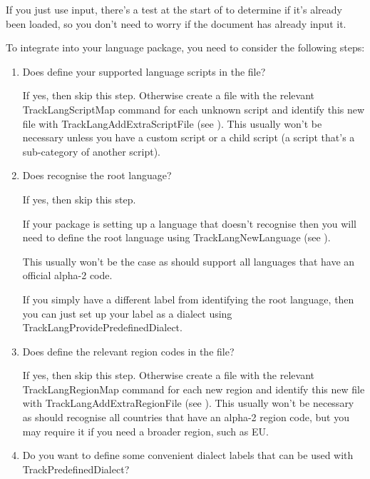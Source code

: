 \documentclass[titlepage=false,oneside,
 fontsize=12pt,captions=tableheading]{scrbook}
\begin{document}
If you just use \gls{input}, there's a test at the start of
 to determine if it's already been loaded, so
you don't need to worry if the document has already input it.

To integrate  into your language package, you need 
to consider the following steps:
\begin{enumerate}
\item Does  define your supported  language
scripts in the  file?

If yes, then skip this step. Otherwise create a file with the
relevant \gls{TrackLangScriptMap} command for each unknown script and identify
this new file with \gls{TrackLangAddExtraScriptFile} (see
). This usually
won't be necessary unless you have a custom script or a child script
(a script that's a sub-category of another script).

\item Does  recognise the root language?

If yes, then skip this step.

If your package is setting up a language that 
doesn't recognise then you will need to define the root language
using \gls{TrackLangNewLanguage} (see ).

This usually won't be the case as  should support all
languages that have an official  alpha-2 code.

If you simply have a different label from 
identifying the root language, then you can just set up your label
as a dialect using \gls{TrackLangProvidePredefinedDialect}.

\item Does  define the relevant  region codes
in the  file?

If yes, then skip this step. Otherwise create a file with the
relevant \gls{TrackLangRegionMap} command for each new region and
identify this new file with \gls{TrackLangAddExtraRegionFile} (see
). This usually won't be necessary as
 should recognise all countries that have an alpha-2
region code, but you may require it if you need a broader region,
such as EU.

\item Do you want to define some convenient dialect labels that can
be used with \gls{TrackPredefinedDialect}?


\end{enumerate}
\end{document}
